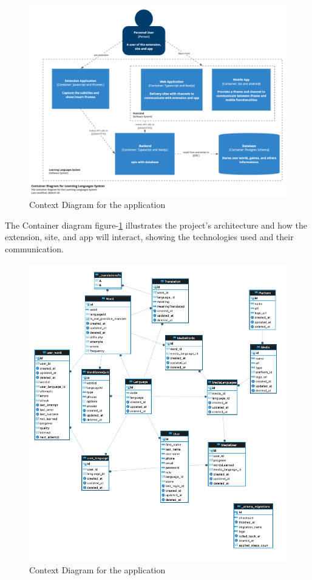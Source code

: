 \documentclass[12pt]{article}
\begin{document}
\begin{figure}
  \centering
  \caption{
  Context Diagram for the application
  }
  \label{fig:container_diagram}
  \includegraphics[width=1\textwidth]{assets/24.png}
\end{figure}



The Container diagram figure-\ref{fig:container_diagram} illustrates the project's architecture and how the extension, site, and app will interact, showing the technologies used and their communication.

\begin{figure}
  \centering
  \caption{
  Context Diagram for the application
  }
  \label{fig:database_diagram}
  \includegraphics[width=1\textwidth]{assets/23.png}
\end{figure}
\end{document}
